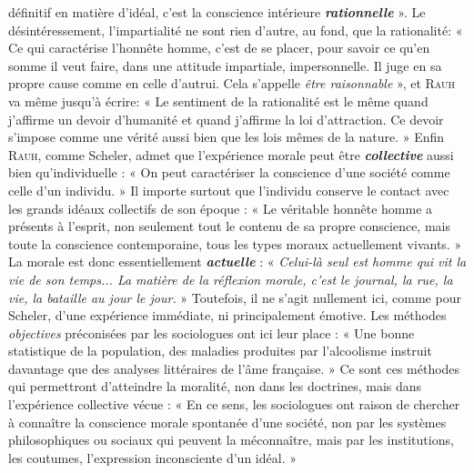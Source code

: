 définitif en matière d’idéal, c’est la conscience intérieure \textbf{\textit {rationnelle}} ».
Le désintéressement, l’impartialité ne sont rien d’autre, au fond, que
la rationalité: « Ce qui caractérise l’honnête homme, c’est de se placer,
pour savoir ce qu’en somme il veut faire, dans une attitude impartiale,
impersonnelle. Il juge en sa propre cause comme en celle d’autrui. Cela
s’appelle {\it être raisonnable} », et \textsc{Rauh} va même jusqu’à écrire: « Le sentiment
de la rationalité est le même quand j’affirme un devoir d’humanité
et quand j’affirme la loi d'attraction. Ce devoir s'impose comme une
vérité aussi bien que les lois mêmes de la nature. » Enfin \textsc{Rauh}, comme
Scheler, admet que l'expérience morale peut être \textbf{\textit {collective}} aussi bien
qu’individuelle : « On peut caractériser la conscience d’une société comme
celle d’un individu. » Il importe surtout que l’individu conserve le
contact avec les grands idéaux collectifs de son époque : « Le véritable
honnête homme a présents à l’esprit, non seulement tout le contenu
de sa propre conscience, mais toute la conscience contemporaine,
tous les types moraux actuellement vivants. » La morale est donc
essentiellement \textbf{\textit {actuelle}} : « {\it Celui-là seul est homme qui vit la vie de
son temps... La matière de la réflexion morale, c’est le journal, la rue,
la vie, la bataille au jour le jour.} » Toutefois, il ne s’agit nullement ici,
comme pour Scheler, d’une expérience immédiate, ni principalement
émotive. Les méthodes {\it objectives} préconisées par les sociologues ont
ici leur place : « Une bonne statistique de la population, des maladies
produites par l'alcoolisme instruit davantage que des analyses littéraires
de l’âme française. » Ce sont ces méthodes qui permettront
d'atteindre la moralité, non dans les doctrines, mais dans l'expérience
collective vécue : « En ce sens, les sociologues ont raison de chercher
à connaître la conscience morale spontanée d’une société, non par les
systèmes philosophiques ou sociaux qui peuvent la méconnaître,
mais par les institutions, les coutumes, l’expression inconsciente d’un
idéal. »

